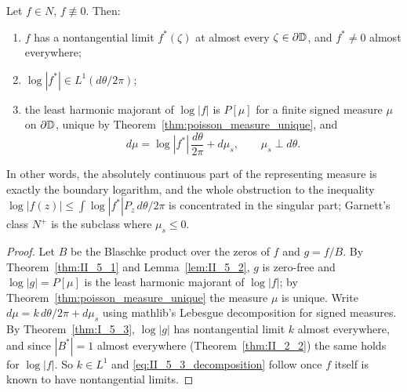 \begin{theorem}
  \label{thm:II_5_3}
  \leanok
  \mainline
  Let $f\in N$, $f\not\equiv0$. Then:
  \begin{enumerate}
    \item $f$ has a nontangential limit $f^*(\zeta)$ at almost every
      $\zeta\in\partial\mathbb{D}$, and $f^*\ne0$ almost everywhere;
    \item $\log|f^*|\in L^1(d\theta/2\pi)$;
    \item the least harmonic majorant of $\log|f|$ is $P[\mu]$ for a finite
      signed measure $\mu$ on $\partial\mathbb{D}$, unique by
      Theorem~\ref{thm:poisson_measure_unique}, and
      \begin{equation}
        \label{eq:II_5_3_decomposition}
        d\mu=\log|f^*|\,\frac{d\theta}{2\pi}+d\mu_s,
        \qquad \mu_s\perp d\theta .
      \end{equation}
  \end{enumerate}
  In other words, the absolutely continuous part of the representing measure
  is exactly the boundary logarithm, and the whole obstruction to the
  inequality $\log|f(z)|\le\int\log|f^*|P_z\,d\theta/2\pi$ is concentrated in
  the singular part; Garnett's class $N^+$ is the subclass where
  $\mu_s\le0$.
  \begin{proof}
    \leanok
    Let $B$ be the Blaschke product over the zeros of $f$ and $g=f/B$. By
    Theorem~\ref{thm:II_5_1} and Lemma~\ref{lem:II_5_2}, $g$ is zero-free and
    $\log|g|=P[\mu]$ is the least harmonic majorant of $\log|f|$; by
    Theorem~\ref{thm:poisson_measure_unique} the measure $\mu$ is unique. Write
    $d\mu=k\,d\theta/2\pi+d\mu_s$ using mathlib's Lebesgue decomposition
    for signed measures. By
    Theorem~\ref{thm:I_5_3}, $\log|g|$ has nontangential limit $k$ almost
    everywhere, and since $|B^*|=1$ almost everywhere
    (Theorem~\ref{thm:II_2_2}) the same holds for $\log|f|$. So $k\in L^1$ and
    \eqref{eq:II_5_3_decomposition} follow once $f$ itself is known to have
    nontangential limits.


\end{proof}
\end{theorem}
